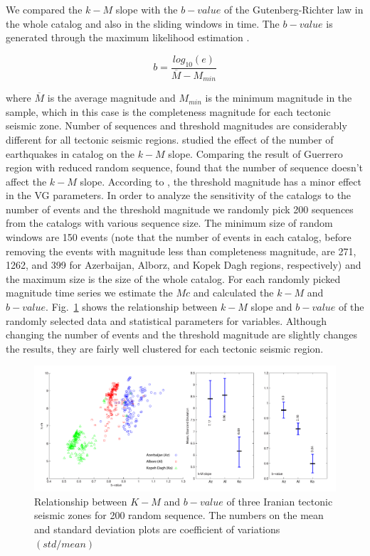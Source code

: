 \noindent
We compared the $k-M$ slope with the $b-value$ of the Gutenberg-Richter law in the whole catalog and also in the sliding windows in time. The $b-value$ is generated through the maximum likelihood estimation \citep{Aki1965}.

\begin{equation}
b = \frac{log_{10}(e) }{\overline{M} - M_{min}}  
\end{equation}
 
 \noindent
 where $\overline{M}$ is the average magnitude and $M_{min}$ is the minimum magnitude in the sample, which in this case is the completeness magnitude for each tectonic seismic zone. Number of sequences and threshold magnitudes are considerably different for all tectonic seismic regions. \citet{Telesca2013} studied the effect of the number of earthquakes in catalog on the $k-M$ slope. Comparing the result of Guerrero region with reduced random sequence, \citet{Telesca2013} found that the number of sequence doesn't affect the $k-M$ slope.  According to \citet{Telesca2012}, the threshold magnitude has a minor effect in the VG parameters. In order to analyze the sensitivity of the catalogs to the number of events and the threshold magnitude we randomly pick 200 sequences from the catalogs with various sequence size. The minimum size of random windows are 150 events (note that the number of events in each catalog, before removing the events with magnitude less than completeness magnitude, are 271, 1262, and 399 for Azerbaijan, Alborz, and Kopek Dagh regions, respectively) and the maximum size is the size of the whole catalog. For each randomly picked magnitude time series we estimate the $Mc$ and calculated the $k-M$ and $b-value$. Fig.~\ref{fig:random} shows the relationship between $k-M$ slope and $b-value$ of the randomly selected data and statistical parameters for variables. Although changing the number of events and the threshold magnitude are slightly changes the results, they are fairly well clustered for each tectonic seismic region. 
 
 \begin{figure} [ht]
\centering
\includegraphics[scale=0.4]{figures/pdf/Figure06.pdf} 
\caption{ Relationship between $K-M$ and $b-value$ of three Iranian tectonic seismic zones for 200 random sequence. The numbers on the mean and standard deviation plots are coefficient of variations $(std/mean)$}
\label{fig:random}
\end{figure}
 
